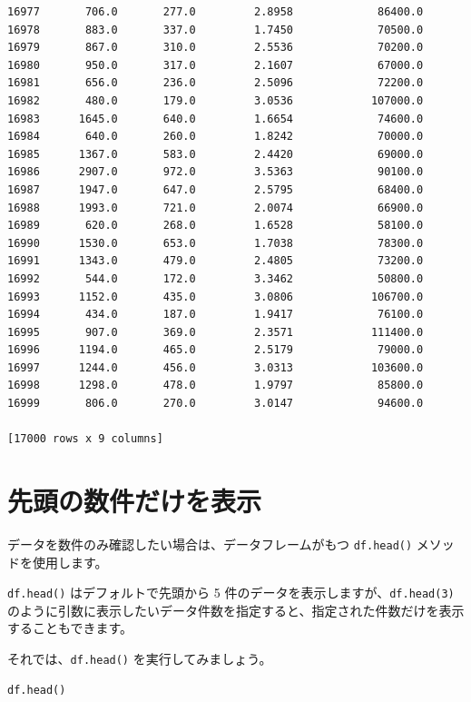 \begin{lstlisting}[style=outputcell]
16977       706.0       277.0         2.8958             86400.0  
16978       883.0       337.0         1.7450             70500.0  
16979       867.0       310.0         2.5536             70200.0  
16980       950.0       317.0         2.1607             67000.0  
16981       656.0       236.0         2.5096             72200.0  
16982       480.0       179.0         3.0536            107000.0  
16983      1645.0       640.0         1.6654             74600.0  
16984       640.0       260.0         1.8242             70000.0  
16985      1367.0       583.0         2.4420             69000.0  
16986      2907.0       972.0         3.5363             90100.0  
16987      1947.0       647.0         2.5795             68400.0  
16988      1993.0       721.0         2.0074             66900.0  
16989       620.0       268.0         1.6528             58100.0  
16990      1530.0       653.0         1.7038             78300.0  
16991      1343.0       479.0         2.4805             73200.0  
16992       544.0       172.0         3.3462             50800.0  
16993      1152.0       435.0         3.0806            106700.0  
16994       434.0       187.0         1.9417             76100.0  
16995       907.0       369.0         2.3571            111400.0  
16996      1194.0       465.0         2.5179             79000.0  
16997      1244.0       456.0         3.0313            103600.0  
16998      1298.0       478.0         1.9797             85800.0  
16999       806.0       270.0         3.0147             94600.0  

[17000 rows x 9 columns]
\end{lstlisting}

\section{先頭の数件だけを表示}


データを数件のみ確認したい場合は、データフレームがもつ \texttt{df.head()} メソッドを使用します。

\texttt{df.head()} はデフォルトで先頭から 5 件のデータを表示しますが、\texttt{df.head(3)} のように引数に表示したいデータ件数を指定すると、指定された件数だけを表示することもできます。

それでは、\texttt{df.head()} を実行してみましょう。


\begin{lstlisting}[style=codecell,language=Python]
df.head()
\end{lstlisting}

